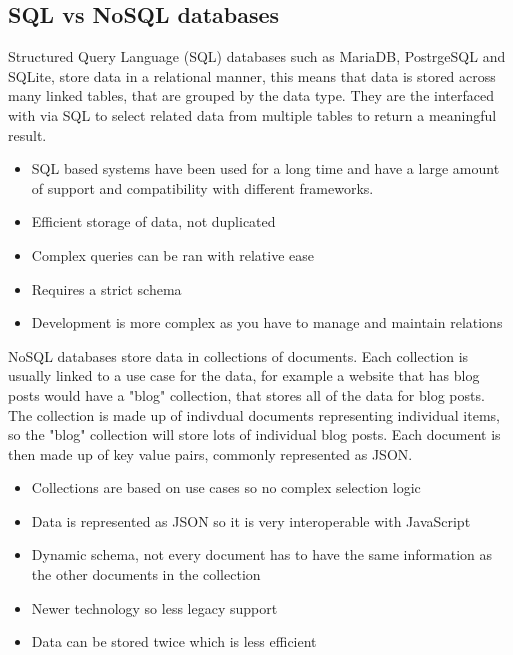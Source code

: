   \subsection{SQL vs NoSQL databases}

  Structured Query Language (SQL) databases such as MariaDB, PostrgeSQL and SQLite, store data in a relational manner, this means that data is stored across many linked tables, that are grouped by the data type. They are the interfaced with via SQL to select related data from multiple tables to return a meaningful result. 
  
  \begin{itemize}
    \item SQL based systems have been used for a long time and have a large amount of support and compatibility with different frameworks. 
    \item Efficient storage of data, not duplicated
    \item Complex queries can be ran with relative ease
    \item Requires a strict schema 
    \item Development is more complex as you have to manage and maintain relations
  \end{itemize}

  NoSQL databases store data in collections of documents. Each collection is usually linked to a use case for the data, for example a website that has blog posts would have a "blog" collection, that stores all of the data for blog posts. The collection is made up of indivdual documents representing individual items, so the "blog" collection will store lots of individual blog posts. Each document is then made up of key value pairs, commonly represented as JSON. 

  \begin{itemize}
    \item Collections are based on use cases so no complex selection logic
    \item Data is represented as JSON so it is very interoperable with JavaScript
    \item Dynamic schema, not every document has to have the same information as the other documents in the collection
    \item Newer technology so less legacy support
    \item Data can be stored twice which is less efficient
  \end{itemize}


